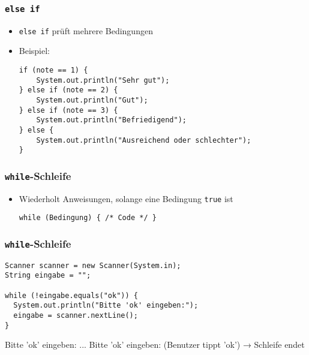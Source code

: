 \documentclass{../../presentation}
\begin{document}
\begin{frame}[fragile]
  \frametitle{\texttt{else if}}
  \begin{itemize}
    \item \texttt{else if} prüft mehrere Bedingungen
    \item Beispiel:
          \begin{verbatim}
if (note == 1) {
    System.out.println("Sehr gut");
} else if (note == 2) {
    System.out.println("Gut");
} else if (note == 3) {
    System.out.println("Befriedigend");
} else {
    System.out.println("Ausreichend oder schlechter");
} 
    \end{verbatim}
  \end{itemize}
\end{frame}

\begin{frame}[fragile]
  \frametitle{\texttt{while}-Schleife}
  \begin{itemize}
    \item  Wiederholt Anweisungen, solange eine Bedingung \texttt{true} ist
          \begin{verbatim}
while (Bedingung) { /* Code */ }
        \end{verbatim}
  \end{itemize}
\end{frame}

\begin{frame}[fragile]
  \frametitle{\texttt{while}-Schleife}
  \begin{verbatim}
Scanner scanner = new Scanner(System.in);
String eingabe = "";

while (!eingabe.equals("ok")) {
  System.out.println("Bitte 'ok' eingeben:");
  eingabe = scanner.nextLine();
}
  \end{verbatim}
  \begin{ausgabe}
    Bitte 'ok' eingeben: \newline
    ...\newline
    Bitte 'ok' eingeben: \newline
    (Benutzer tippt 'ok') → Schleife endet
  \end{ausgabe}
\end{frame}
\end{document}
